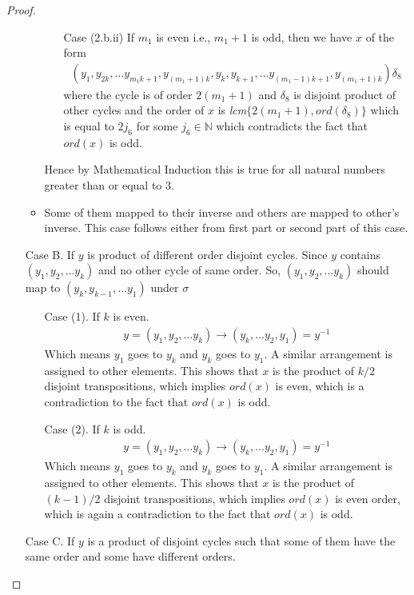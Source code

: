 \documentclass[10pt,a4paper]{amsart}
\newcommand{\ord}{ord}
\begin{document}
\begin{proof}
\begin{itemize}
\begin{itemize}
\begin{itemize}
                        \item[Case (2.b.ii)] If $m_1$ is even i.e., $m_1 + 1$ is odd, then we have $x$ of the form
                        \begin{align*}
                            (y_1, y_{2k}, \ldots y_{m_1k + 1}, y_{(m_1 + 1)k}, y_k, y_{k + 1}, \ldots y_{(m_1 - 1)k + 1}, y_{(m_1 + 1)k})\delta_8
                        \end{align*} where the cycle is of order $2(m_1 + 1)$ and $\delta_8$ is disjoint product of other cycles and the order of $x$ is \textit{lcm}$\{2(m_1 + 1), \ord(\delta_8)\}$ which is equal to $2j_6$ for some $j_6 \in \mathbb{N}$ which contradicts the fact that $\ord(x)$ is odd.
                    \end{itemize}
                    Hence by Mathematical Induction this is true for all natural numbers greater than or equal to 3.
                    \item Some of them mapped to their inverse and others are mapped to other's inverse. This case follows either from first part or second part of this case.
                \end{itemize}
                \item[Case B.] If $y$ is product of different order disjoint cycles. 
                Since $y$ contains $(y_1, y_2, \ldots y_k)$ and no other cycle of same order. So, $(y_1, y_2, \ldots y_k)$ should map to $(y_k, y_{k - 1}, \ldots y_1)$ under $\sigma$
                    \begin{enumerate}
                        \item[Case (1).] If $k$ is even. \begin{align*}
                            y = (y_1, y_2, \ldots y_k) \rightarrow (y_k, \ldots y_2, y_1) = y^{-1}
                        \end{align*}
                        Which means $y_1$ goes to $y_k$ and $y_k$ goes to $y_1$. A similar arrangement is assigned to other elements. This shows that $x$ is the product of $k/2$ disjoint transpositions, which implies $\ord (x)$ is even, which is a contradiction to the fact that $\ord(x)$ is odd.
                        \item[Case (2).] If $k$ is odd.
                        \begin{align*}
                            y = (y_1, y_2, \ldots y_k) \rightarrow (y_k, \ldots y_2, y_1) = y^{-1}
                        \end{align*}
                        Which means $y_1$ goes to $y_k$ and $y_k$ goes to $y_1$. A similar arrangement is assigned to other elements. This shows that $x$ is the product of $(k-1)/2$ disjoint transpositions, which implies $\ord(x)$ is even order, which is again a contradiction to the fact that $\ord(x)$ is odd.
                    \end{enumerate}
                \item[Case C.] If $y$ is a product of disjoint cycles such that some of them have the same order and some have different orders.


\end{itemize}
\end{proof}
\end{document}
